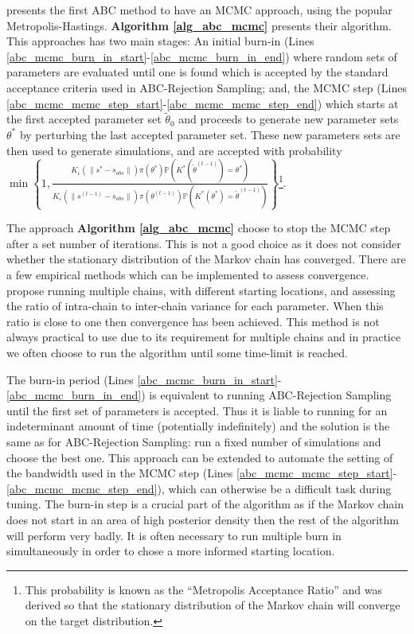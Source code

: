 \documentclass[11pt,a4paper]{article}
\newcommand*{\prob}{\mathbb{P}}
\theoremstyle{break}
\begin{document}
  \par \cite[]{mcmc_wo_likelihood} presents the first ABC method to have an MCMC approach, using the popular Metropolis-Hastings. \textbf{Algorithm \ref{alg_abc_mcmc}} presents their algorithm. This approaches has two main stages: An initial burn-in (Lines \ref{abc_mcmc_burn_in_start}-\ref{abc_mcmc_burn_in_end}) where random sets of parameters are evaluated until one is found which is accepted by the standard acceptance criteria used in ABC-Rejection Sampling; and, the MCMC step (Lines \ref{abc_mcmc_mcmc_step_start}-\ref{abc_mcmc_mcmc_step_end}) which starts at the first accepted parameter set $\tilde\theta_0$ and proceeds to generate new parameter sets $\theta^*$ by perturbing the last accepted parameter set. These new parameters sets are then used to generate simulations, and are accepted with probability $\min\left\{1,\frac{K_\varepsilon(\|s^*-s_{obs}\|)\pi(\theta^*)\prob\left(K^*(\tilde\theta^{(t-1)})=\theta^*\right)}{K_\varepsilon(\|s^{(t-1)}-s_{obs}\|)\pi(\theta^{(t-1)})\prob\left(K^*(\theta^*)=\tilde\theta^{(t-1)}\right)}\right\}$\footnote{This probability is known as the ``Metropolis Acceptance Ratio'' and was derived so that the stationary distribution of the Markov chain will converge on the target distribution.}.

  \par The approach \textbf{Algorithm \ref{alg_abc_mcmc}} choose to stop the MCMC step after a set number of iterations. This is not a good choice as it does not consider whether the stationary distribution of the Markov chain has converged. There are a few empirical methods which can be implemented to assess convergence. \cite[]{inference_from_iterative_simulation_using_multiple_sequences} propose running multiple chains, with different starting locations, and assessing the ratio of intra-chain to inter-chain variance for each parameter. When this ratio is close to one then convergence has been achieved. This method is not always practical to use due to its requirement for multiple chains and in practice we often choose to run the algorithm until some time-limit is reached.

  \par The burn-in period (Lines \ref{abc_mcmc_burn_in_start}-\ref{abc_mcmc_burn_in_end}) is equivalent to running ABC-Rejection Sampling until the first set of parameters is accepted. Thus it is liable to running for an indeterminant amount of time (potentially indefinitely) and the solution is the same as for ABC-Rejection Sampling: run a fixed number of simulations and choose the best one. This approach can be extended to automate the setting of the bandwidth used in the MCMC step (Lines \ref{abc_mcmc_mcmc_step_start}-\ref{abc_mcmc_mcmc_step_end}), which can otherwise be a difficult task during tuning. The burn-in step is a crucial part of the algorithm as if the Markov chain does not start in an area of high posterior density then the rest of the algorithm will perform very badly. It is often necessary to run multiple burn in simultaneously in order to chose a more informed starting location.
\end{document}
